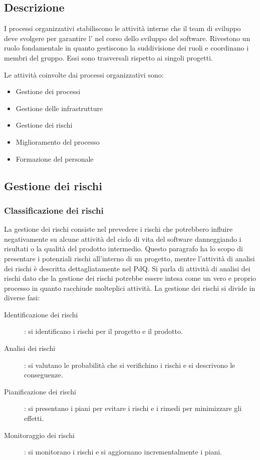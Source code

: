 \documentclass[../norme-di-progetto.tex]{subfiles}
\begin{document}
\subsection{Descrizione}%
\label{sub:processi organizzativi/descrizione}

I processi organizzativi stabiliscono le attività interne che il team di sviluppo deve svolgere per garantire l' nel corso dello sviluppo del software.
Rivestono un ruolo fondamentale in quanto gestiscono la suddivisione dei ruoli e coordinano i membri del gruppo.
Essi sono trasversali rispetto ai singoli progetti.

Le attività coinvolte dai processi organizzativi sono:

\begin{itemize}
  \item Gestione dei processi
  \item Gestione delle infrastrutture
  \item Gestione dei rischi
  \item Miglioramento del processo
  \item Formazione del personale
\end{itemize}

\subsection{Gestione dei rischi}%
\label{sub:gestione dei rischi}

\subsubsection{Classificazione dei rischi}%
\label{subs:classificazione dei rischi}
La gestione dei rischi consiste nel prevedere i rischi che potrebbero influire negativamente su alcune attività del ciclo di vita del software danneggiando i risultati o la qualità del prodotto intermedio.
Questo paragrafo ha lo scopo di presentare i potenziali rischi all'interno di un progetto, mentre l'attività di analisi dei rischi è descritta dettagliatamente nel PdQ.
Si parla di attività di analisi dei rischi dato che la gestione dei rischi potrebbe essere intesa come un vero e proprio processo in quanto racchiude molteplici attività. La gestione dei rischi si divide in diverse fasi:

\begin{description}
  \item [Identificazione dei rischi]: si identificano i rischi per il progetto e il prodotto.
  \item [Analisi dei rischi]: si valutano le probabilità che si verifichino i rischi e si descrivono le conseguenze.
  \item [Pianificazione dei rischi]: si presentano i piani per evitare i rischi e i rimedi per minimizzare gli effetti.
  \item [Monitoraggio dei rischi]: si monitorano i rischi e si aggiornano incrementalmente i piani.
\end{description}
\end{document}

